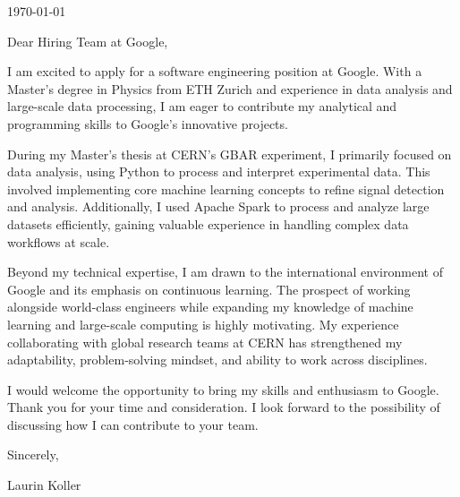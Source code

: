 \documentclass[10pt, a4paper]{article}
\begin{document}
\makeprofile %

\makecontact %

\today %

\makeemployerinfo %

Dear Hiring Team at Google,

I am excited to apply for a software engineering position at Google. With a Master’s degree in Physics from ETH Zurich and experience in data analysis and large-scale data processing, I am eager to contribute my analytical and programming skills to Google’s innovative projects.

During my Master’s thesis at CERN’s GBAR experiment, I primarily focused on data analysis, using Python to process and interpret experimental data. This involved implementing core machine learning concepts to refine signal detection and analysis. Additionally, I used Apache Spark to process and analyze large datasets efficiently, gaining valuable experience in handling complex data workflows at scale.

Beyond my technical expertise, I am drawn to the international environment of Google and its emphasis on continuous learning. The prospect of working alongside world-class engineers while expanding my knowledge of machine learning and large-scale computing is highly motivating. My experience collaborating with global research teams at CERN has strengthened my adaptability, problem-solving mindset, and ability to work across disciplines.

I would welcome the opportunity to bring my skills and enthusiasm to Google. Thank you for your time and consideration. I look forward to the possibility of discussing how I can contribute to your team.

Sincerely,

Laurin Koller
\end{document}

